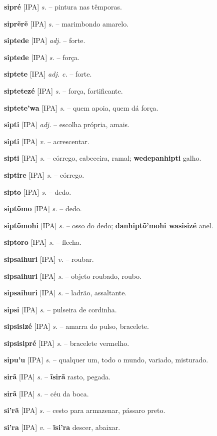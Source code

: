 \textbf{sipré} [IPA] \textit{s.} -- pintura nas têmporas.

\textbf{siprẽrẽ} [IPA] \textit{s.} -- marimbondo amarelo.

\textbf{siptede} [IPA] \textit{adj.} -- forte.

\textbf{siptede} [IPA] \textit{s.} -- força.

\textbf{siptete} [IPA] \textit{adj. c.} -- forte.

\textbf{siptetezé} [IPA] \textit{s.} -- força, fortificante.

\textbf{siptete'wa} [IPA] \textit{s.} -- quem apoia, quem dá força.

\textbf{sipti} [IPA] \textit{adj.} -- escolha própria, amais.

\textbf{sipti} [IPA] \textit{v.} -- acrescentar.

\textbf{sipti} [IPA] \textit{s.} -- córrego, cabeceira, ramal; \textbf{wedepanhipti} galho.

\textbf{siptire} [IPA] \textit{s.} -- córrego.

\textbf{sipto} [IPA] \textit{s.} -- dedo.

\textbf{siptõmo} [IPA] \textit{s.} -- dedo.

\textbf{siptõmohi} [IPA] \textit{s.} -- osso do dedo; \textbf{danhiptõ'mohi wasisizé} anel.

\textbf{siptoro} [IPA] \textit{s.} -- flecha.

\textbf{sipsaihuri} [IPA] \textit{v.} -- roubar.

\textbf{sipsaihuri} [IPA] \textit{s.} -- objeto roubado, roubo.

\textbf{sipsaihuri} [IPA] \textit{s.} -- ladrão, assaltante.

\textbf{sipsi} [IPA] \textit{s.} -- pulseira de cordinha.

\textbf{sipsisizé} [IPA] \textit{s.} -- amarra do pulso, bracelete.

\textbf{sipsisipré} [IPA] \textit{s.} -- bracelete vermelho.

\textbf{sipu'u} [IPA] \textit{s.} -- qualquer um, todo o mundo, variado, misturado.

\textbf{sirã} [IPA] \textit{s.} -- \textbf{ĩsirã} rasto, pegada.

\textbf{sirã} [IPA] \textit{s.} -- céu da boca.

\textbf{si'rã} [IPA] \textit{s.} -- cesto para armazenar, pássaro preto.

\textbf{si'ra} [IPA] \textit{v.} -- \textbf{ĩsi'ra} descer, abaixar.

